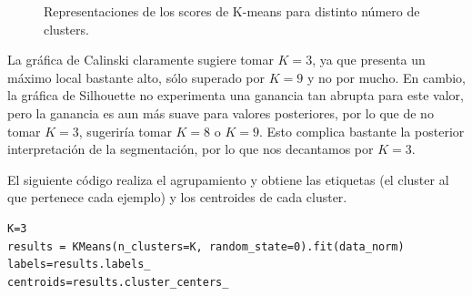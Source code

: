 \documentclass[oneside]{book}
\begin{document}
\begin{figure}[H]
  \centering
  \caption{Representaciones de los scores de K-means para distinto número de clusters.}
  \label{fig:k-means1-scores}
\end{figure}

La gráfica de Calinski claramente sugiere tomar $K=3$, ya que presenta
un máximo local bastante alto, sólo superado por $K=9$ y no por
mucho. En cambio, la gráfica de Silhouette no experimenta una ganancia
tan abrupta para este valor, pero la ganancia es aun más suave para
valores posteriores, por lo que de no tomar $K=3$, sugeriría tomar
$K=8$ o $K=9$. Esto complica bastante la posterior interpretación de
la segmentación, por lo que nos decantamos por $K=3$.

El siguiente código realiza el agrupamiento y obtiene las etiquetas
(el cluster al que pertenece cada ejemplo) y los centroides de cada
cluster.

\begin{verbatim}
K=3
results = KMeans(n_clusters=K, random_state=0).fit(data_norm)
labels=results.labels_
centroids=results.cluster_centers_
\end{verbatim}
\end{document}
